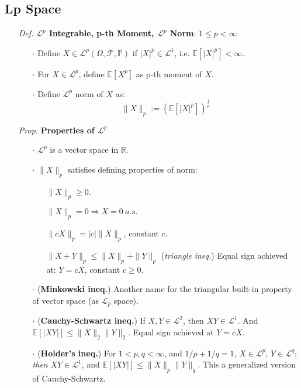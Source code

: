 \documentclass[a4paper,12pt,twoside]{book}
\begin{document}
\subsection{Lp Space}
\begin{itemize}
	\item[\textit{Def.}] \textbf{$\mathcal{L}^p$ Integrable, p-th Moment, $\mathcal{L}^p$ Norm}: $1\leq p<\infty$
	\begin{itemize}
		\item[$\cdot$] Define $X\in \mathcal{L}^p (\Omega, \mathcal{F}, \mathbb{P})$ if $|X|^p \in \mathcal{L}^1$, i.e. $\mathbb{E}[|X|^p]<\infty$.
		\item[$\cdot$] For $X\in \mathcal{L}^p$, define $\mathbb{E}[X^p]$ as p-th moment of $X$.
		\item[$\cdot$] Define $\mathcal{L}^p$ norm of $X$ as:
		\begin{equation}
			\|X\|_p:=\left(\mathbb{E}[|X|^p]\right)^{\frac{1}{p}}
		\end{equation}
	\end{itemize}
	\item[\textit{Prop.}] \textbf{Properties of $\mathcal{L}^p$}
		\begin{itemize}
			\item[$\cdot$] $\mathcal{L}^p$ is a vector space in $\mathbb{R}$.

			\item[$\cdot$] $\|X\|_p$ satisfies defining properties of norm: 
			\begin{itemize}
				\item[] $\|X\|_p \geq 0$.
				\item[] $\|X\|_p=0\Rightarrow X=0~a.s.$
				\item[] $\|cX\|_p = |c| \|X\|_p$, constant $c$.
				\item[] $\|X+Y\|_p \leq \|X\|_p + \|Y\|_p$ (\textit{triangle ineq.}) Equal sign achieved at: $Y=cX$, constant $c\geq 0$.
			\end{itemize}

			\item[$\cdot$] (\textbf{Minkowski ineq.}) Another name for the triangular built-in property of vector space (as $\mathcal{L}_p$ space).

			\item[$\cdot$] (\textbf{Cauchy-Schwartz ineq.}) If $X,Y \in \mathcal{L}^2$, then $XY \in \mathcal{L}^1$. And $\mathbb{E}[|XY|]\leq \|X\|_2 \|Y\|_2$. Equal sign achieved at $Y=cX$.

			\item[$\cdot$] (\textbf{Holder's ineq.}) For $1<p,q<\infty$, and $1/p+1/q=1$, $X\in \mathcal{L}^p$, $Y\in \mathcal{L}^q$; \textit{then} $XY\in \mathcal{L}^1$, and $\mathbb{E}[|XY|]\leq \|X\|_p \|Y\|_q$. This a generalized version of Cauchy-Schwartz.


\end{itemize}
\end{itemize}
\end{document}

